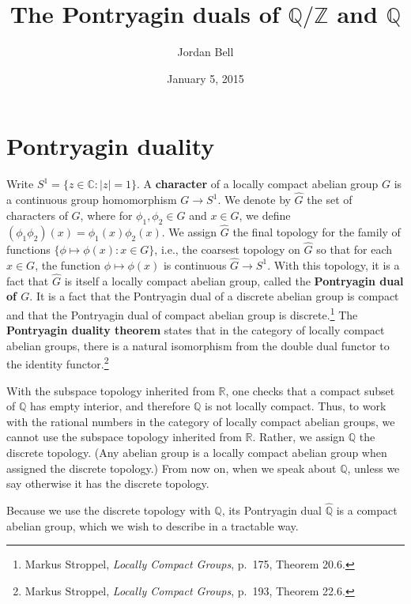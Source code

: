 \documentclass{article}
\theoremstyle{definition}
\begin{document}
\title{The Pontryagin duals of $\mathbb{Q}/\mathbb{Z}$ and $\mathbb{Q}$}
\author{Jordan Bell}
\date{January 5, 2015}

\maketitle



\section{Pontryagin duality}
Write $S^1=\{z \in \mathbb{C}: |z|=1\}$. 
A \textbf{character} of a locally compact abelian group $G$ is a continuous group homomorphism $G \to S^1$.
We denote by $\widehat{G}$ the set of characters of $G$, where for $\phi_1,\phi_2 \in \widehat{G}$ and $x \in G$,
we define $(\phi_1 \phi_2)(x)=\phi_1(x)\phi_2(x)$. We assign $\widehat{G}$ the final topology for the family of functions
$\{\phi \mapsto \phi(x): x \in G\}$, i.e., the coarsest topology on $\widehat{G}$ so that for each $x \in G$, the function $\phi \mapsto \phi(x)$ is continuous
$\widehat{G} \to S^1$. With this topology, it is a fact that $\widehat{G}$ is itself a locally compact abelian group, called  the \textbf{Pontryagin dual of $G$}.
It is a fact that the Pontryagin dual of a discrete abelian group is compact and that the Pontryagin dual of compact abelian group is discrete.\footnote{Markus Stroppel, {\em Locally Compact Groups},
p.~175, Theorem 20.6.}
The \textbf{Pontryagin duality theorem} states that in the category
of locally compact abelian groups, there is a natural
isomorphism from the double dual functor to the identity functor.\footnote{Markus Stroppel, {\em Locally Compact Groups},
p.~193, Theorem 22.6.}


With the subspace topology inherited from
$\mathbb{R}$, one checks that
a compact subset of $\mathbb{Q}$ has empty
interior, and therefore $\mathbb{Q}$ is not locally compact.
Thus, to work with the rational numbers in the category of locally compact abelian groups, we cannot use the subspace topology inherited from
$\mathbb{R}$. Rather, we assign $\mathbb{Q}$ the discrete topology. (Any abelian group is a locally compact abelian group when assigned the discrete
topology.) From now on, when we speak about $\mathbb{Q}$, unless we say otherwise it has the discrete topology.

Because we use the discrete topology with $\mathbb{Q}$, its Pontryagin
dual $\widehat{\mathbb{Q}}$ is a compact abelian group, which we wish to describe in a tractable way. 
\end{document}
